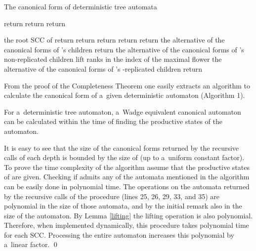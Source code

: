 \documentclass{LMCS}
\begin{document}
\begin{algorithm}
\caption{The canonical form of deterministic tree automata}
\begin{algorithmic}[1]
 \STATE return 
 \STATE return 
 \STATE return 

\ELSE


\STATE  the root SCC of  
\STATE return 
\STATE return 
\ELSE 
\STATE return 
\ENDIF
{}
\STATE return 
\ELSE
\STATE return  
\ENDIF
\ELSE
\STATE  the alternative of the canonical forms of 's children
\STATE return 
\ENDIF
{}
\STATE  the alternative of  the canonical forms of 's non-replicated children 
\STATE lift ranks in 
\STATE  the index of the maximal flower
\STATE  the alternative of the canonical forms of 's -replicated children
\ENDFOR
\STATE return 
\ENDIF
\ENDIF
\end{algorithmic}
\end{algorithm}

From the proof of the Completeness Theorem one easily extracts an algorithm to calculate the canonical form of a~given deterministic automaton (Algorithm 1). 

\begin{cor} \label{canonical}
For a~deterministic tree automaton, a~Wadge equivalent canonical automaton can be calculated within the time of finding the productive states of the automaton.
\end{cor}

\proof It is easy to see that the size of the canonical forms returned by the recursive calls of each depth is bounded by the size of  (up to a~uniform constant factor). To prove the time complexity of the algorithm assume that the productive states of  are given. Checking if  admits any of the automata mentioned in the algorithm can be easily done in polynomial time. The operations on the automata returned by the recursive calls of the procedure (lines 25, 26, 29, 33, and 35) are polynomial in the size of those automata, and by the initial remark also in the size of the automaton. By Lemma \ref{lifting} the lifting operation is also polynomial. Therefore, when implemented dynamically, this procedure takes polynomial time for each SCC. Processing the entire automaton increases this polynomial by a~linear factor. \qed

\vspace{5pt}
\end{document}
